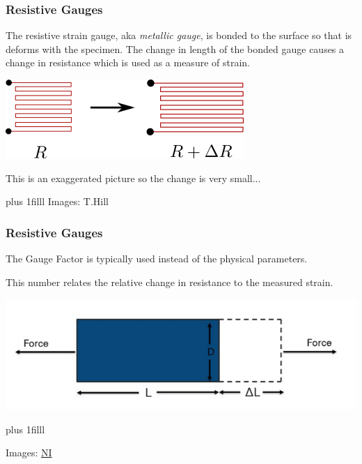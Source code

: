 \documentclass[fleqn]{beamer} %
\newcommand{\sectionIIsubsectionItitle}{Resistive Gauges}
\newcommand{\btVFill}{\vskip0pt plus 1filll}
\begin{document}
			\begin{frame}[label=sectionIIsubsectionI]
				\frametitle{\sectionIIsubsectionItitle} \scriptsize

				\bigskip	
				The resistive strain gauge, aka {\it metallic gauge}, is bonded to the surface so that is deforms with the specimen. The change in length of the bonded gauge causes a change in resistance which is used as a measure of strain. \vspccc


				\begin{multicols}{2}

				\includegraphics[scale=0.5]{images/stretched_gauge.png}

				This is an exaggerated picture so the change is  very small...

				\end{multicols}

				
				
				\btVFill
				{\tiny Images: T.Hill}
		
			\end{frame}

		    \begin{frame}[label=sectionIIsubsectionI]
				\frametitle{\sectionIIsubsectionItitle} \scriptsize

				The {\PN Gauge Factor} is typically used instead of the physical parameters. \vspcc

				\vspcc

				This number relates the relative change in resistance to the measured strain. \vspc

				\includegraphics[scale=.25]{images/strain_fig2.png}

				\btVFill

				{\tiny Images: \href{https://www.ni.com/en-us/innovations/white-papers/07/measuring-strain-with-strain-gages.html}{NI}}
					
			\end{frame}	
\end{document}
